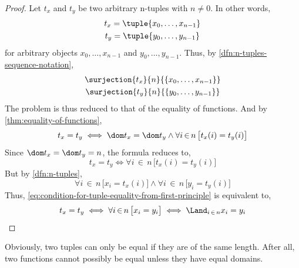 \begin{proof}
    Let \( t_{x} \) and \( t_{y} \) be two arbitrary n-tuples with \( n \neq 0 \).
    In other words,
    \begin{gather*}
        t_{x} = \tuple{x_{0},\dots,x_{n-1}}\\
        t_{y} = \tuple{y_{0},\dots,y_{n-1}}
    \end{gather*}
    for arbitrary objects \( x_{0},\dots,x_{n-1} \) and \( y_{0},\dots,y_{n-1} \).
    Thus, by \cref{dfn:n-tuples-sequence-notation},
    \begin{gather*}
        \surjection{t_{x}}{n}{\mleft\{ x_{0},\dots,x_{n-1} \mright\}} \\
        \surjection{t_{y}}{n}{\mleft\{ y_{0},\dots,y_{n-1}\mright\}}
    \end{gather*}
    The problem is thus reduced to that of the equality of functions. And by \cref{thm:equality-of-functions},
    \begin{equation*}
        t_{x} = t_{y} \iff \dom t_{x} = \dom t_{y} \land \forall i\,{\in}\,n \, \big[ t_{x}(i) = t_{y}(i) \big]
    \end{equation*}
    Since \( \dom t_{x} = \dom t_{y} = n \), the formula reduces to,
    \begin{equation}
        \label{eq:condition-for-tuple-equality-from-first-principle}
        t_{x} = t_{y} \iff \forall i\,{\in}\,n \, \big[ t_{x}(i) = t_{y}(i) \big]
    \end{equation}
    But by \cref{dfn:n-tuples},
    \begin{equation*}
        \forall i\,{\in}\,n \, \big[ x_{i} = t_{x}(i) \big] \land
        \forall i\,{\in}\,n \, \big[ y_{i} = t_{y}(i) \big]
    \end{equation*}
    Thus, \eqref{eq:condition-for-tuple-equality-from-first-principle} is equivalent to,
    \begin{equation*}
        t_{x} = t_{y} \iff \forall i\,{\in}\,n \, \big[ x_{i} = y_{i} \big]
        \iff \Land_{i \,{\in}\, n} x_{i} = y_{i} \qedhere
    \end{equation*}
\end{proof}

\begin{rem}
    Obviously, two tuples can only be equal if they are of the same length.
    After all, two functions cannot possibly be equal unless they have
    equal domains.
\end{rem}

